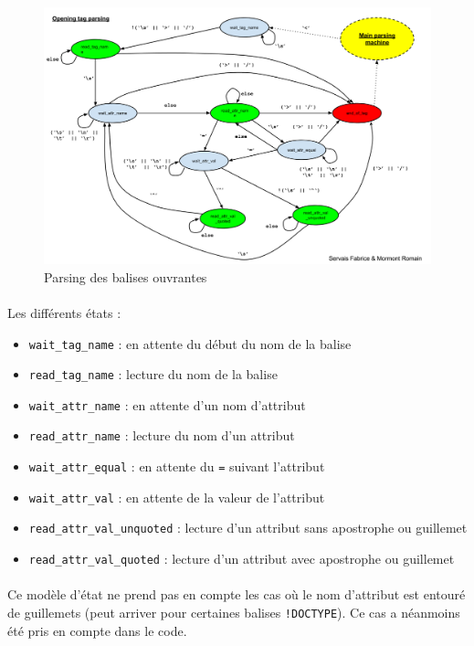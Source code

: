 \documentclass[a4paper,11pt]{article}
\begin{document}
\begin{figure}[h]
	\center
	\includegraphics[scale=0.35]{parseOpeningTagFSM.png}
	\caption{Parsing des balises ouvrantes}
	\label{ref:pars_opening}
\end{figure}

\paragraph{}
Les différents états :
\begin{itemize}
	\item \texttt{wait\_tag\_name} : en attente du début du nom de la balise 
	\item \texttt{read\_tag\_name} : lecture du nom de la balise
	\item \texttt{wait\_attr\_name} : en attente d'un nom d'attribut
	\item \texttt{read\_attr\_name} : lecture du nom d'un attribut
	\item \texttt{wait\_attr\_equal} : en attente du \texttt{=} suivant l'attribut
	\item \texttt{wait\_attr\_val} : en attente de la valeur de l'attribut
	\item \texttt{read\_attr\_val\_unquoted} : lecture d'un attribut sans apostrophe ou guillemet
	\item \texttt{read\_attr\_val\_quoted} :  lecture d'un attribut avec apostrophe ou guillemet
\end{itemize}
\paragraph{}
Ce modèle d'état ne prend pas en compte les cas où le nom d'attribut est entouré de guillemets (peut arriver pour certaines balises \texttt{!DOCTYPE}). Ce cas a néanmoins été pris en compte dans le code.
\end{document}
